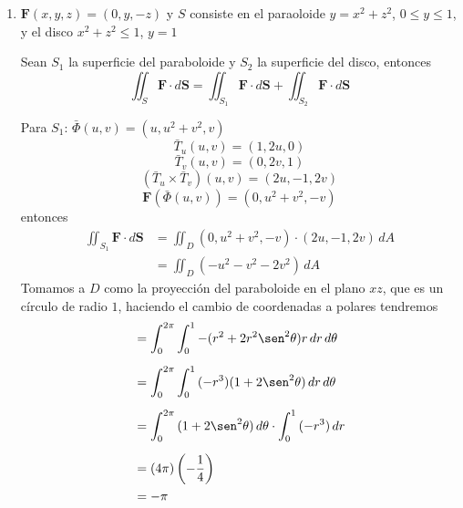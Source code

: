 \documentclass{article}
\begin{document}
\begin{enumerate}
{            \begin{enumerate}
            \item{
                $\mathbf{F} (x,y,z) = (0,y,-z)$ y $S$ consiste en el paraoloide
                $y = x^2 + z^2$, $0 \leq y \leq 1$, y el disco
                $x^2 + z^2 \leq 1$, $y = 1$

			\color{azul}
            Sean $S_1$ la superficie del paraboloide y $S_2$ la superficie del disco, entonces
            $$ \iint_{S} \mathbf{F} \cdot d \mathbf{S}
            = \iint_{S_1} \mathbf{F} \cdot d \mathbf{S}
            + \iint_{S_2} \mathbf{F} \cdot d \mathbf{S} $$

            Para $S_1$: $\bar{\Phi}(u,v)=\left(u, u^2+v^2, v\right)$
            $$ \bar{T}_u(u,v)=\left(1, 2u, 0\right) $$
            $$ \bar{T}_v(u,v)=\left(0, 2v, 1\right) $$
            $$ (\bar{T}_u \times \bar{T}_v)(u,v)=\left(2u, -1, 2v\right) $$
            $$ \mathbf{F}(\bar{\Phi}(u,v)) = \left(0, u^2+v^2, -v\right)$$
            entonces
            \begin{align*}
                \iint_{S_1} \mathbf{F} \cdot d \mathbf{S}
                &= \iint_D{(0, u^2+v^2, -v)\cdot(2u, -1, 2v)\,dA}\\[.2cm]
                &= \iint_D{(-u^2-v^2-2v^2)\,dA}
            \end{align*}
            Tomamos a $D$ como la proyección del paraboloide en el plano $xz$, que es un círculo de radio $1$, haciendo el cambio de coordenadas a polares tendremos
            \begin{align*}
                &= \int_{0}^{2\pi}{
                    \int_{0}^{1}{
                        -(r^2+2r^2\sen^2{\theta})r
                    \,dr}
                \,d\theta}\\[.2cm]
                &= \int_{0}^{2\pi}{
                    \int_{0}^{1}{
                        (-r^3)(1+2\sen^2{\theta})
                    \,dr}
                \,d\theta}\\[.2cm]
                &= \int_{0}^{2\pi}{
                    (1+2\sen^2{\theta})
                \,d\theta}
                \cdot
                \int_{0}^{1}{
                    (-r^3)
                \,dr}\\[.2cm]
                &= (4\pi)\left(-\frac{1}{4}\right)\\
                &= -\pi
            \end{align*}

}
\end{enumerate}}
\end{enumerate}
\end{document}
